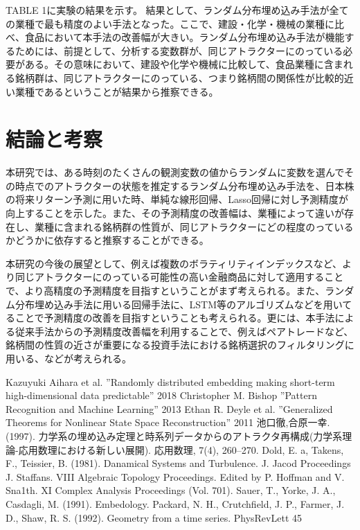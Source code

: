 \documentclass[JEL]{AEA}
\begin{document}
TABLE 1に実験の結果を示す。
結果として、ランダム分布埋め込み手法が全ての業種で最も精度のよい手法となった。ここで、建設・化学・機械の業種に比べ、食品において本手法の改善幅が大きい。ランダム分布埋め込み手法が機能するためには、前提として、分析する変数群が、同じアトラクターにのっている必要がある。その意味において、建設や化学や機械に比較して、食品業種に含まれる銘柄群は、同じアトラクターにのっている、つまり銘柄間の関係性が比較的近い業種であるということが結果から推察できる。


\section{結論と考察}

本研究では、ある時刻のたくさんの観測変数の値からランダムに変数を選んでその時点でのアトラクターの状態を推定するランダム分布埋め込み手法を、日本株の将来リターン予測に用いた時、単純な線形回帰、Lasso回帰に対し予測精度が向上することを示した。また、その予測精度の改善幅は、業種によって違いが存在し、業種に含まれる銘柄群の性質が、同じアトラクターにどの程度のっているかどうかに依存すると推察することができる。

本研究の今後の展望として、例えば複数のボラティリティインデックスなど、より同じアトラクターにのっている可能性の高い金融商品に対して適用することで、より高精度の予測精度を目指すということがまず考えられる。また、ランダム分布埋め込み手法に用いる回帰手法に、LSTM等のアルゴリズムなどを用いてることで予測精度の改善を目指すということも考えられる。更には、本手法による従来手法からの予測精度改善幅を利用することで、例えばペアトレードなど、銘柄間の性質の近さが重要になる投資手法における銘柄選択のフィルタリングに用いる、などが考えられる。



% 

\begin{thebibliography}{10}
 Kazuyuki Aihara et al. ''Randomly distributed embedding making short-term high-dimensional data predictable'' 2018
 Christopher M. Bishop ''Pattern Recognition and Machine Learning'' 2013
 Ethan R. Deyle et al. ''Generalized Theorems for Nonlinear State Space Reconstruction'' 2011
 池口徹,合原一幸. (1997). 力学系の埋め込み定理と時系列データからのアトラクタ再構成(力学系理論-応用数理における新しい展開). 応用数理, 7(4), 260–270.
 Dold, E. a, Takens, F., Teissier, B. (1981). Danamical Systems and Turbulence. J. Jacod Proceedings J. Staffans. VIII Algebraic Topology Proceedings. Edited by P. Hoffman and V. Sna1th. XI Complex Analysis Proceedings (Vol. 701).
 Sauer, T., Yorke, J. A., Casdagli, M. (1991). Embedology.
  Packard, N. H., Crutchfield, J. P., Farmer, J. D.,  Shaw, R. S. (1992). Geometry from a time series. PhysRevLett 45
\end{thebibliography}

\appendix
\end{document}
